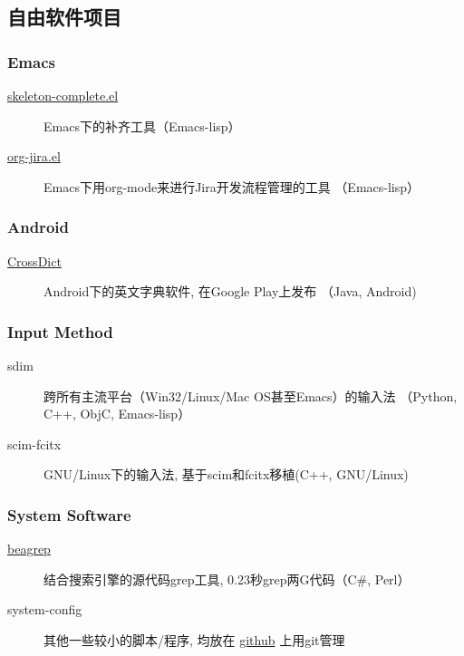 \documentclass[11pt,dvipdfm,CJKbookmarks]{article}
\begin{document}
\begin{CJK*}{UTF8}{simsun}
\section{自由软件项目}
\label{sec-2}

\subsubsection{Emacs}
\label{sec-2-0-1}

\begin{description}
\item[\href{http://github.com/baohaojun/skeleton-complete}{skeleton-complete.el}] Emacs下的补齐工具（Emacs-lisp）

\item[\href{https://github.com/baohaojun/org-jira}{org-jira.el}] Emacs下用org-mode来进行Jira开发流程管理的工具
（Emacs-lisp）
\end{description}
\subsubsection{Android}
\label{sec-2-0-2}
\begin{description}
\item[\href{https://github.com/baohaojun/BTAndroidWebViewSelection}{CrossDict}] Android下的英文字典软件, 在Google Play上发布
（Java, Android)
\end{description}
\subsubsection{Input Method}
\label{sec-2-0-3}
\begin{description}
\item[sdim] 跨所有主流平台（Win32/Linux/Mac OS甚至Emacs）的输入法
（Python, C++, ObjC, Emacs-lisp）

\item[scim-fcitx] GNU/Linux下的输入法, 基于scim和fcitx移植(C++,
GNU/Linux)
\end{description}
\subsubsection{System Software}
\label{sec-2-0-4}
\begin{description}
\item[\href{https://github.com/baohaojun/beagrep}{beagrep}] 结合搜索引擎的源代码grep工具, 0.23秒grep两G代码（C\#,
Perl）

\item[system-config] 其他一些较小的脚本/程序, 均放在 \href{https://github.com/baohaojun}{github} 上用git管理
\end{description}


\end{CJK*}
\end{document}
